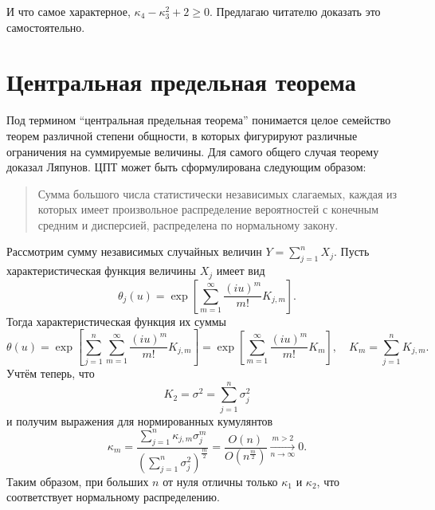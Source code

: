 И что самое характерное, \( \kappa_4 - \kappa_3^2 + 2 \ge 0 \). Предлагаю
читателю доказать это самостоятельно.

\section{Центральная предельная теорема}

Под термином ``центральная предельная теорема'' понимается целое семейство
теорем различной степени общности, в которых фигурируют различные ограничения на
суммируемые величины. Для самого общего случая теорему доказал Ляпунов. ЦПТ
может быть сформулирована следующим образом:
\begin{quotation}
    Сумма большого числа статистически независимых слагаемых, каждая из которых
    имеет произвольное распределение вероятностей с конечным средним и
    дисперсией, распределена по нормальному закону.
\end{quotation}

Рассмотрим сумму независимых случайных величин \( Y = \sum_{j=1}^{n} X_j \).
Пусть характеристическая функция величины \( X_j \) имеет вид
\[
    \theta_j(u)=\exp\left[\sum_{m=1}^\infty\frac{(iu)^m}{m!}K_{j,m}\right].
\]
Тогда характеристическая функция их суммы
\[
    \theta(u)=\exp\left[\sum_{j=1}^n\sum_{m=1}^\infty
        \frac{(iu)^m}{m!}K_{j,m}\right] =
        \exp\left[\sum_{m=1}^\infty\frac{(iu)^m}{m!}K_m\right],\quad
    K_m = \sum_{j=1}^n K_{j,m}.
\]
Учтём теперь, что
\[
    K_2 = \sigma^2 = \sum_{j=1}^n \sigma_j^2
\]
и получим выражения для нормированных кумулянтов
\[
    \kappa_m = \frac{\sum\limits_{j=1}^n \kappa_{j,m} \sigma_j^m }
        {\left(\sum\limits_{j=1}^n \sigma_j^2\right)^\frac{m}{2}} =
        \frac{O(n)}{O(n^\frac{m}{2})} \xrightarrow[n\to\infty]{m>2} 0.
\]
Таким образом, при больших \( n \) от нуля отличны только \( \kappa_1 \) и
\( \kappa_2 \), что соответствует нормальному распределению.

